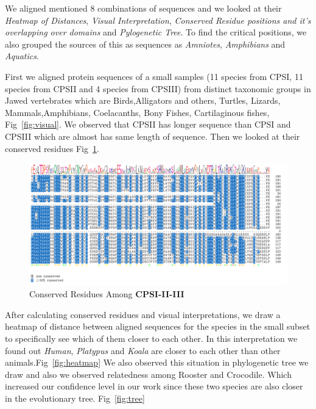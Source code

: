 \documentclass[a4paper]{article}
\begin{document}
We aligned mentioned $8$ combinations of sequences and we looked at their \textit{Heatmap of Distances}, \textit{Visual Interpretation}, \textit{Conserved Residue positions and it's overlapping over domains} and \textit{Pylogenetic Tree}. To find the critical positions, we also grouped the sources of this as sequences as \textit{Amniotes}, \textit{Amphibians} and \textit{Aquatics}.

\par
\smallskip
First we aligned protein sequences of a small samples (11 species from CPSI, 11 species from CPSII and 4 species from CPSIII) from distinct taxonomic groups in Jawed vertebrates which are Birds,Alligators and others, Turtles, Lizards, Mammals,Amphibians, Coelacanths, Bony Fishes, Cartilaginous fishes, Fig~\ref{fig:visual}. We observed that CPSII has longer sequence than CPSI and CPSIII which are almost has same length of sequence. 
Then we looked at their conserved residues Fig~\ref{fig:conserved}. 

\newpage

\begin{figure}[H]
\begin{center}
\includegraphics[width=\textwidth]{conserved.png}
\end{center}
\caption{Conserved Residues Among \textbf{CPSI-II-III}}
\label{fig:conserved}
\end{figure}

After calculating conserved residues and visual interpretations, we draw a heatmap of distance between aligned sequences for the species in the small subset to specifically see which of them closer to each other. In this interpretation we found out \textit{Human}, \textit{Platypus} and \textit{Koala} are closer to each other than other animals.Fig~\ref{fig:heatmap} We also observed this situation in phylogenetic tree we draw and also we observed relatedness among Rooster and Crocodile. Which increased our confidence level in our work since these two species are also closer in the evolutionary tree. Fig~\ref{fig:tree}
\end{document}
